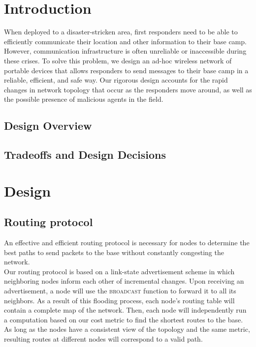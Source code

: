 \documentclass[letterpaper]{article}
\begin{document}
\section{Introduction}

When deployed to a disaster-stricken area, first responders need to be able to efficiently communicate their
location and other information to their base camp. However, communication infrastructure is often unreliable
or inaccessible during these crises. To solve this problem, we design an ad-hoc wireless network of portable
devices that allows responders to send messages to their base camp in a reliable, efficient, and safe way.
Our rigorous design accounts for the rapid changes in network topology that occur as the responders move 
around, as well as the possible presence of malicious agents in the field. 

\subsection{Design Overview}



\subsection{Tradeoffs and Design Decisions}

\section{Design}

\subsection{Routing protocol}

An effective and efficient routing protocol is necessary for nodes to determine the best paths to send
packets to the base without constantly congesting the network.
\\

\noindent Our routing protocol is based on a link-state advertisement scheme in which neighboring nodes 
inform each other of incremental changes. Upon receiving an advertisement, a node will use the 
\textsc{broadcast} function to forward it to all its neighbors. As a result of this flooding process,
each node's routing table will contain a complete map of the network. Then, each node will independently
run a computation based on our cost metric to find the shortest routes to the base. As long as the nodes
have a consistent view of the topology and the same metric, resulting routes at different nodes will
correspond to a valid path.
\\
\end{document}
